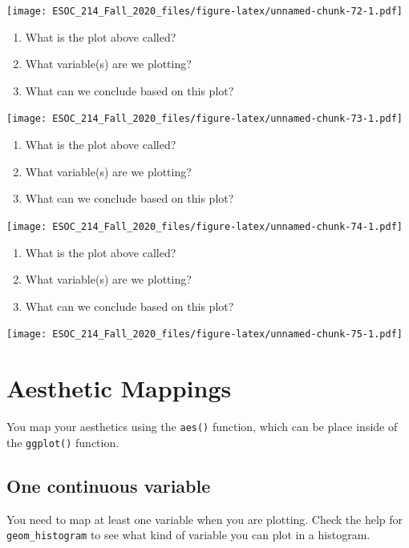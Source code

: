 \documentclass[
]{book}
\begin{document}
\texttt{[image: ESOC\_214\_Fall\_2020\_files/figure-latex/unnamed-chunk-72-1.pdf]}

\begin{enumerate}
\def\labelenumi{\arabic{enumi})}
\item
  What is the plot above called?
\item
  What variable(s) are we plotting?
\item
  What can we conclude based on this plot?
\end{enumerate}

\texttt{[image: ESOC\_214\_Fall\_2020\_files/figure-latex/unnamed-chunk-73-1.pdf]}

\begin{enumerate}
\def\labelenumi{\arabic{enumi})}
\item
  What is the plot above called?
\item
  What variable(s) are we plotting?
\item
  What can we conclude based on this plot?
\end{enumerate}

\texttt{[image: ESOC\_214\_Fall\_2020\_files/figure-latex/unnamed-chunk-74-1.pdf]}

\begin{enumerate}
\def\labelenumi{\arabic{enumi})}
\item
  What is the plot above called?
\item
  What variable(s) are we plotting?
\item
  What can we conclude based on this plot?
\end{enumerate}

\texttt{[image: ESOC\_214\_Fall\_2020\_files/figure-latex/unnamed-chunk-75-1.pdf]}

\hypertarget{aesthetic-mappings}{%
\section{Aesthetic Mappings}\label{aesthetic-mappings}}

You map your aesthetics using the \texttt{aes()} function, which can be place inside of the \texttt{ggplot()} function.

\hypertarget{one-continuous-variable}{%
\subsection{One continuous variable}\label{one-continuous-variable}}

You need to map at least one variable when you are plotting. Check the help for \texttt{geom\_histogram} to see what kind of variable you can plot in a histogram.
\end{document}
